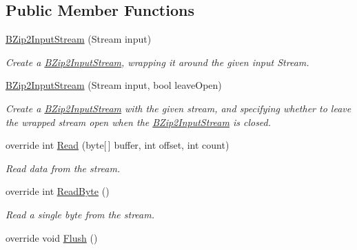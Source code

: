 \subsection*{Public Member Functions}
\begin{DoxyCompactItemize}
\item 
\mbox{\hyperlink{class_super_tiled2_unity_1_1_ionic_1_1_b_zip2_1_1_b_zip2_input_stream_a955dd86b095b4df3d266b00e659be60b}{B\+Zip2\+Input\+Stream}} (Stream input)
\begin{DoxyCompactList}\small\item\em Create a \mbox{\hyperlink{class_super_tiled2_unity_1_1_ionic_1_1_b_zip2_1_1_b_zip2_input_stream}{B\+Zip2\+Input\+Stream}}, wrapping it around the given input Stream. \end{DoxyCompactList}\item 
\mbox{\hyperlink{class_super_tiled2_unity_1_1_ionic_1_1_b_zip2_1_1_b_zip2_input_stream_a4e4207d28578fefec93dc5b297ccf810}{B\+Zip2\+Input\+Stream}} (Stream input, bool leave\+Open)
\begin{DoxyCompactList}\small\item\em Create a \mbox{\hyperlink{class_super_tiled2_unity_1_1_ionic_1_1_b_zip2_1_1_b_zip2_input_stream}{B\+Zip2\+Input\+Stream}} with the given stream, and specifying whether to leave the wrapped stream open when the \mbox{\hyperlink{class_super_tiled2_unity_1_1_ionic_1_1_b_zip2_1_1_b_zip2_input_stream}{B\+Zip2\+Input\+Stream}} is closed. \end{DoxyCompactList}\item 
override int \mbox{\hyperlink{class_super_tiled2_unity_1_1_ionic_1_1_b_zip2_1_1_b_zip2_input_stream_a80f460d6901a773419ccd51b10a91fa6}{Read}} (byte\mbox{[}$\,$\mbox{]} buffer, int offset, int count)
\begin{DoxyCompactList}\small\item\em Read data from the stream. \end{DoxyCompactList}\item 
override int \mbox{\hyperlink{class_super_tiled2_unity_1_1_ionic_1_1_b_zip2_1_1_b_zip2_input_stream_a8ab15212a893aa47d345905f265d6be6}{Read\+Byte}} ()
\begin{DoxyCompactList}\small\item\em Read a single byte from the stream. \end{DoxyCompactList}\item 
override void \mbox{\hyperlink{class_super_tiled2_unity_1_1_ionic_1_1_b_zip2_1_1_b_zip2_input_stream_a30a8f2459c46c5b348b0e2c577678f48}{Flush}} ()

\end{DoxyCompactItemize}
